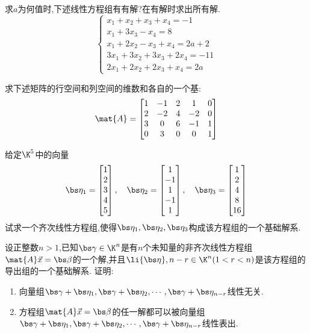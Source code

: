 \documentclass{ctexart}
\begin{document}
\pagestyle{empty}
\begin{center}
\end{center}
\begin{homework}[1(20')]
    求$a$为何值时,下述线性方程组有有解?在有解时求出所有解.
    \[\left\{\begin{array}{l}
        x_1+x_2+x_3+x_4=-1\\
        x_1+3x_3-x_4=8\\
        x_1+2x_2-x_3+x_4=2a+2\\
        3x_1+3x_2+3x_3+2x_4=-11\\
        2x_1+2x_2+2x_3+x_4=2a
    \end{array}\right.\]
\end{homework}
\begin{homework}[2(20')]
    求下述矩阵的行空间和列空间的维数和各自的一个基:
    \[\mat{A}=\begin{bmatrix}
        1&-1&2&1&0\\
        2&-2&4&-2&0\\
        3&0&6&-1&1\\
        0&3&0&0&1
    \end{bmatrix}\]
\end{homework}
\begin{homework}[3(20')]
    给定$\K^5$中的向量
    \[\bs\eta_1=\begin{bmatrix}
        1\\2\\3\\4\\5
    \end{bmatrix},\quad\bs\eta_2=\begin{bmatrix}
        1\\-1\\1\\-1\\1
    \end{bmatrix},\quad\bs\eta_3=\begin{bmatrix}
        1\\2\\4\\8\\16
    \end{bmatrix}\]
    试求一个齐次线性方程组,使得$\bs\eta_1,\bs\eta_2,\bs\eta_3$构成该方程组的一个基础解系.
\end{homework}
\begin{homework}[4(10')]
    设正整数$n>1$,已知$\bs\gamma\in\K^n$是有$n$个未知量的非齐次线性方程组$\mat{A}\vec{x}=\bs\beta$的一个解,并且$\li{\bs\eta},{n-r}\in\K^n(1<r<n)$是该方程组的导出组的一个基础解系.
    证明:
    \begin{enumerate}
        \item 向量组$\bs\gamma+\bs\eta_1,\bs\gamma+\bs\eta_2,\cdots,\bs\gamma+\bs\eta_{n-r}$线性无关.
        \item 方程组$\mat{A}\vec{x}=\bs\beta$的任一解都可以被向量组$\bs\gamma+\bs\eta_1,\bs\gamma+\bs\eta_2,\cdots,\bs\gamma+\bs\eta_{n-r}$线性表出.
    \end{enumerate}
\end{homework}
\end{document}
